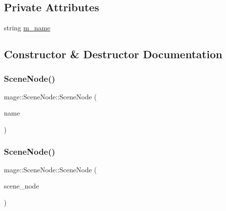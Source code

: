 \subsection*{Private Attributes}
\begin{DoxyCompactItemize}
\item 
string \hyperlink{classmage_1_1_scene_node_a3ba13ec190df3e020c89d2ace0301dec}{m\+\_\+name}
\end{DoxyCompactItemize}


\subsection{Constructor \& Destructor Documentation}
\hypertarget{classmage_1_1_scene_node_afc138707692a66952484ae2b3c6e15d5}{}\label{classmage_1_1_scene_node_afc138707692a66952484ae2b3c6e15d5} 
\subsubsection{\texorpdfstring{Scene\+Node()}{SceneNode()}\hspace{0.1cm}{\footnotesize\ttfamily [1/3]}}
{\footnotesize\ttfamily mage\+::\+Scene\+Node\+::\+Scene\+Node (\begin{DoxyParamCaption}\item[{const string \&}]{name }\end{DoxyParamCaption})\hspace{0.3cm}{\ttfamily [explicit]}}

\hypertarget{classmage_1_1_scene_node_a0259a6b573eb633b589cd986b9ec6734}{}\label{classmage_1_1_scene_node_a0259a6b573eb633b589cd986b9ec6734} 
\subsubsection{\texorpdfstring{Scene\+Node()}{SceneNode()}\hspace{0.1cm}{\footnotesize\ttfamily [2/3]}}
{\footnotesize\ttfamily mage\+::\+Scene\+Node\+::\+Scene\+Node (\begin{DoxyParamCaption}\item[{const \hyperlink{classmage_1_1_scene_node}{Scene\+Node} \&}]{scene\+\_\+node }\end{DoxyParamCaption})\hspace{0.3cm}{\ttfamily [default]}}


